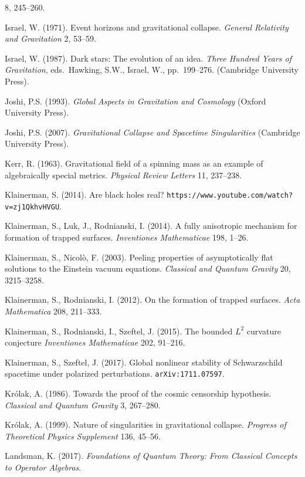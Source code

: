 \documentclass[12pt]{article}
\begin{document}
\begin{small}
\begin{thebibliography}{99}
  8, 245--260. 
  \item[] Israel, W. (1971). Event horizons and gravitational collapse. \emph{General Relativity and Gravitation}
2, 53--59. 
 \item[] Israel, W. (1987). Dark stars: The evolution of an idea. \emph{Three Hundred Years of Gravitation}, eds.\ Hawking, S.W., Israel, W., pp.\ 199--276.
(Cambridge University Press). 
\item[] Joshi, P.S. (1993). \emph{Global Aspects in Gravitation and Cosmology} (Oxford University Press). 
\item[] Joshi, P.S. (2007). \emph{Gravitational Collapse and Spacetime Singularities}  (Cambridge University Press).
\item[] Kerr, R. (1963). Gravitational field of a spinning mass as an example of algebraically special
metrics. \emph{Physical Review Letters} 11, 237--238.
\item[]  Klainerman, S. (2014). Are black holes real? \verb#https://www.youtube.com/watch?v=zj1QkhvHVGU#.
\item[]  Klainerman, S.,  Luk, J.,  Rodnianski, I.  (2014). A fully anisotropic mechanism for formation of
trapped surfaces.  \emph{Inventiones Mathematicae} 198, 1--26. 
\item[]  Klainerman, S.,   Nicol\`{o}, F. (2003). Peeling properties of asymptotically flat solutions to the Einstein vacuum equations. \emph{Classical and Quantum Gravity} 20, 3215--3258.
\item[]  Klainerman, S.,  Rodnianski, I. (2012). On the formation of trapped surfaces. \emph{Acta Mathematica}
 208,  211--333.
\item[]  Klainerman, S.,  Rodnianski, I., Szeftel, J. (2015).
The bounded $L^2$ curvature conjecture \emph{Inventiones Mathematicae} 202, 91--216.
\item[]  Klainerman, S.,  Szeftel, J. (2017).
Global nonlinear stability of Schwarzschild spacetime under polarized perturbations.
\texttt{arXiv:1711.07597}.
\item[]  Kr\'{o}lak, A. (1986). Towards the proof of the cosmic censorship hypothesis. \emph{Classical and Quantum Gravity} 3, 267--280. 
\item[]  Kr\'{o}lak, A. (1999). Nature of singularities in gravitational collapse.
\emph{Progress of Theoretical Physics Supplement} 136, 45--56. 
\item[]   Landsman, K. (2017). \emph{Foundations of Quantum Theory: From Classical Concepts to Operator Algebras}. 

\end{thebibliography}
\end{small}
\end{document}
